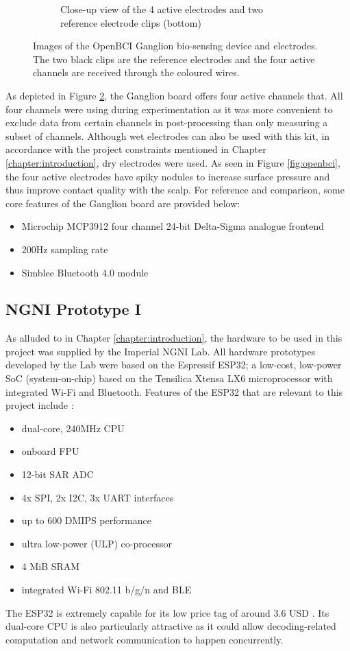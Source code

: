 \begin{figure}
\begin{subfigure}[c]{0.45\textwidth}
         \caption{Close-up view of the 4 active electrodes and two reference electrode clips (bottom)}
         \label{fig:openbci-electrodes}
     \end{subfigure}
        \caption[Images of the OpenBCI Ganglion bio-sensing device and electrodes]{Images of the OpenBCI Ganglion bio-sensing device and electrodes. The two black clips are the reference electrodes and the four active channels are received through the coloured wires.}
        \label{fig:openbci-subfigs}
\end{figure}
As depicted in Figure \ref{fig:openbci-subfigs}, the Ganglion board offers four active channels that. All four channels were using during experimentation as it was more convenient to exclude data from certain channels in post-processing than only measuring a subset of channels. Although wet electrodes can also be used with this kit, in accordance with the project constraints mentioned in Chapter \ref{chapter:introduction}, dry electrodes were used. As seen in Figure \ref{fig:openbci}, the four active electrodes have spiky nodules to increase surface pressure and thus improve contact quality with the scalp. For reference and comparison, some core features of the Ganglion board are provided below:
\begin{itemize}
    \item Microchip MCP3912 four channel 24-bit Delta-Sigma analogue frontend
    \item 200Hz sampling rate
    \item Simblee Bluetooth 4.0 module
\end{itemize}

\subsection{NGNI Prototype I}

As alluded to in Chapter \ref{chapter:introduction}, the hardware to be used in this project was supplied by the Imperial NGNI Lab. All hardware prototypes developed by the Lab were based on the Espressif ESP32; a low-cost, low-power SoC (system-on-chip) based on the Tensilica Xtensa LX6 microprocessor with integrated Wi-Fi and Bluetooth. Features of the ESP32 that are relevant to this project include \cite{esp32-digikey}:
\begin{itemize}
    \item dual-core, 240MHz CPU
    \item onboard FPU
    \item 12-bit SAR ADC
    \item 4x SPI, 2x I2C, 3x UART interfaces
    \item up to 600 DMIPS performance
    \item ultra low-power (ULP) co-processor
    \item 4 MiB SRAM
    \item integrated Wi-Fi 802.11 b/g/n and BLE
\end{itemize}
The ESP32 is extremely capable for its low price tag of around 3.6 USD \cite{esp32-digikey}. Its dual-core CPU is also particularly attractive as it could allow decoding-related computation and network communication to happen concurrently.

